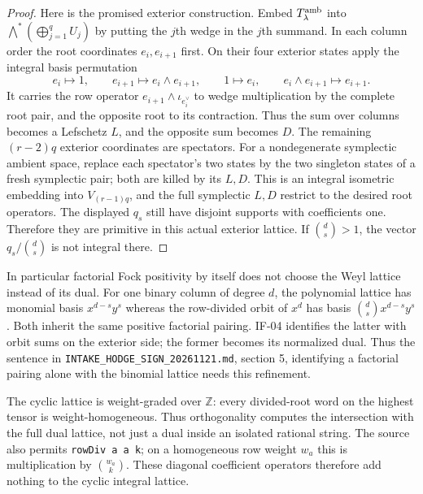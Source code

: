 \begin{proof}
Here is the promised exterior construction. Embed
$T^{\rm amb}_\lambda$ into
$\bigwedge^*(\bigoplus_{j=1}^q U_j)$ by putting the $j$th wedge in the
$j$th summand. In each column order the root coordinates $e_i,e_{i+1}$
first. On their four exterior states apply the integral basis
permutation
\[
 e_i\mapsto1,\qquad e_{i+1}\mapsto e_i\wedge e_{i+1},\qquad
 1\mapsto e_i,\qquad e_i\wedge e_{i+1}\mapsto e_{i+1}.
\]
It carries the row operator $e_{i+1}\wedge\iota_{e_i^\vee}$ to wedge
multiplication by the complete root pair, and the opposite root to its
contraction. Thus the sum over columns becomes a Lefschetz $L$, and the
opposite sum becomes $D$. The remaining $(r-2)q$ exterior coordinates
are spectators. For a nondegenerate symplectic ambient space, replace
each spectator's two states by the two singleton states of a fresh
symplectic pair; both are killed by its $L,D$. This is an integral
isometric embedding into $V_{(r-1)q}$, and the full symplectic $L,D$
restrict to the desired root operators. The displayed $q_s$ still have
disjoint supports with coefficients one. Therefore they are primitive
in this actual exterior lattice. If $\binom ds>1$, the vector
$q_s/\binom ds$ is not integral there.
\end{proof}

In particular factorial Fock positivity by itself does not choose the
Weyl lattice instead of its dual. For one binary column of degree $d$,
the polynomial lattice has monomial basis $x^{d-s}y^s$ whereas the
row-divided orbit of $x^d$ has basis
$\binom ds x^{d-s}y^s$. Both inherit the same positive factorial
pairing. IF-04 identifies the latter with orbit sums on the exterior
side; the former becomes its normalized dual. Thus the sentence in
\texttt{INTAKE\_HODGE\_SIGN\_20261121.md}, section 5, identifying a
factorial pairing alone with the binomial lattice needs this refinement.

The cyclic lattice is weight-graded over $\mathbb Z$: every divided-root
word on the highest tensor is weight-homogeneous. Thus orthogonality
computes the intersection with the full dual lattice, not just a dual
inside an isolated rational string. The source also permits
\texttt{rowDiv a a k}; on a homogeneous row weight $w_a$ this is
multiplication by $\binom{w_a}{k}$. These diagonal coefficient
operators therefore add nothing to the cyclic integral lattice.

